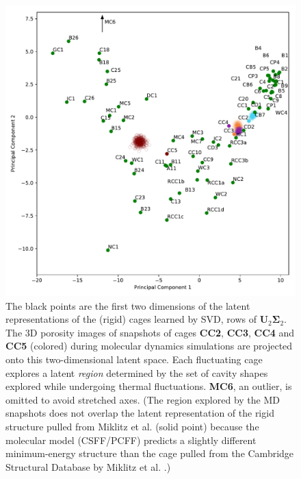 \documentclass[journal=jacsat,manuscript=article]{achemso}
\begin{document}
\begin{figure}
\centering
	\includegraphics[width=\columnwidth]{../PCA_latent_cage_space_with_flexible_cages_2D.pdf}
	\caption{The black points are the first two dimensions of the latent representations of the (rigid) cages learned by SVD, rows of $\mathbf{U}_2\mathbf{\Sigma}_2$.
The 3D porosity images of snapshots of cages \textbf{CC2}, \textbf{CC3}, \textbf{CC4} and \textbf{CC5} (colored) during molecular dynamics simulations are projected onto this two-dimensional latent space. Each fluctuating cage explores a latent \emph{region} determined by the set of cavity shapes explored while undergoing thermal fluctuations. \textbf{MC6}, an outlier, is omitted to avoid stretched axes. (The region explored by the MD snapshots does not overlap the latent representation of the rigid structure pulled from Miklitz et al. \cite{miklitz2017computational} (solid point) because the molecular model (CSFF/PCFF) predicts a slightly different minimum-energy structure than the cage pulled from the Cambridge Structural Database by Miklitz et al. \cite{miklitz2017computational}.)
	} \label{fig:pca_space_with_flex}
\end{figure}
\end{document}
